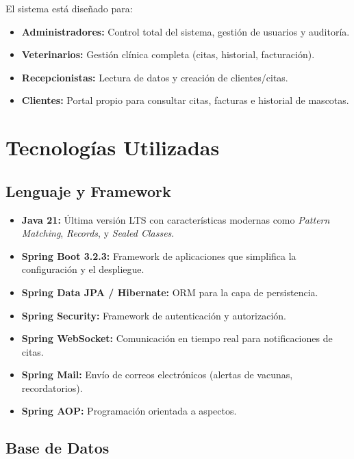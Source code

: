 El sistema est\'a dise\~nado para:

\begin{itemize}
    \item \textbf{Administradores:} Control total del sistema, gesti\'on de usuarios y auditor\'ia.
    \item \textbf{Veterinarios:} Gesti\'on cl\'inica completa (citas, historial, facturaci\'on).
    \item \textbf{Recepcionistas:} Lectura de datos y creaci\'on de clientes/citas.
    \item \textbf{Clientes:} Portal propio para consultar citas, facturas e historial de mascotas.
\end{itemize}

\section{Tecnolog\'ias Utilizadas}

\subsection{Lenguaje y Framework}

\begin{itemize}
    \item \textbf{Java 21:} \'Ultima versi\'on LTS con caracter\'isticas modernas como \textit{Pattern Matching}, \textit{Records}, y \textit{Sealed Classes}.
    \item \textbf{Spring Boot 3.2.3:} Framework de aplicaciones que simplifica la configuraci\'on y el despliegue.
    \item \textbf{Spring Data JPA / Hibernate:} ORM para la capa de persistencia.
    \item \textbf{Spring Security:} Framework de autenticaci\'on y autorizaci\'on.
    \item \textbf{Spring WebSocket:} Comunicaci\'on en tiempo real para notificaciones de citas.
    \item \textbf{Spring Mail:} Env\'io de correos electr\'onicos (alertas de vacunas, recordatorios).
    \item \textbf{Spring AOP:} Programaci\'on orientada a aspectos.
\end{itemize}

\subsection{Base de Datos}

